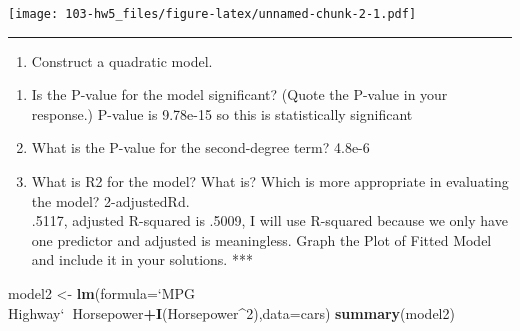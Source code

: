 \documentclass[]{article}
\newenvironment{Shaded}{\begin{snugshade}}{\end{snugshade}}
\newcommand{\DataTypeTok}[1]{\textcolor[rgb]{0.13,0.29,0.53}{#1}}
\newcommand{\DecValTok}[1]{\textcolor[rgb]{0.00,0.00,0.81}{#1}}
\newcommand{\KeywordTok}[1]{\textcolor[rgb]{0.13,0.29,0.53}{\textbf{#1}}}
\newcommand{\NormalTok}[1]{#1}
\newcommand{\OperatorTok}[1]{\textcolor[rgb]{0.81,0.36,0.00}{\textbf{#1}}}
\newcommand{\StringTok}[1]{\textcolor[rgb]{0.31,0.60,0.02}{#1}}
\providecommand{\tightlist}{%
  \setlength{\itemsep}{0pt}\setlength{\parskip}{0pt}}
\begin{document}
\begin{Shaded}
\end{Shaded}

\texttt{[image: 103-hw5\_files/figure-latex/unnamed-chunk-2-1.pdf]}

\begin{center}\rule{0.5\linewidth}{0.5pt}\end{center}

\begin{enumerate}
\def\labelenumi{\arabic{enumi}.}
\setcounter{enumi}{1}
\tightlist
\item
  Construct a quadratic model.
\end{enumerate}

\begin{enumerate}
\def\labelenumi{\alph{enumi}.}
\tightlist
\item
  Is the P-value for the model significant? (Quote the P-value in your
  response.) P-value is 9.78e-15 so this is statistically significant
\item
  What is the P-value for the second-degree term? 4.8e-6
\item
  What is R2 for the model? What is? Which is more appropriate in
  evaluating the model? 2-adjustedRd.\\
  .5117, adjusted R-squared is .5009, I will use R-squared because we
  only have one predictor and adjusted is meaningless. Graph the Plot of
  Fitted Model and include it in your solutions. ***
\end{enumerate}

\begin{Shaded}
\begin{Highlighting}[]
\NormalTok{model2 <-}\StringTok{ }\KeywordTok{lm}\NormalTok{(}\DataTypeTok{formula=}\StringTok{`}\DataTypeTok{MPG Highway}\StringTok{`}\OperatorTok{~}\NormalTok{Horsepower}\OperatorTok{+}\KeywordTok{I}\NormalTok{(Horsepower}\OperatorTok{^}\DecValTok{2}\NormalTok{),}\DataTypeTok{data=}\NormalTok{cars)}
\KeywordTok{summary}\NormalTok{(model2)}
\end{Highlighting}
\end{Shaded}
\end{document}
